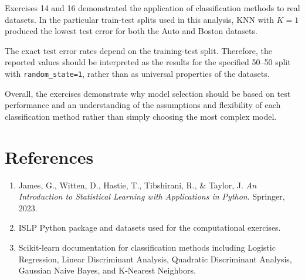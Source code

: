 \documentclass[12pt,a4paper]{article}
\begin{document}
Exercises 14 and 16 demonstrated the application of classification methods
to real datasets. In the particular train-test splits used in this analysis,
KNN with $K=1$ produced the lowest test error for both the Auto and Boston
datasets.

The exact test error rates depend on the training-test split. Therefore, the
reported values should be interpreted as the results for the specified
50--50 split with \texttt{random\_state=1}, rather than as universal
properties of the datasets.

Overall, the exercises demonstrate why model selection should be based on
test performance and an understanding of the assumptions and flexibility of
each classification method rather than simply choosing the most complex
model.


\section{References}

\begin{enumerate}

\item James, G., Witten, D., Hastie, T., Tibshirani, R., \& Taylor, J.
\textit{An Introduction to Statistical Learning with Applications in Python}.
Springer, 2023.

\item ISLP Python package and datasets used for the computational exercises.

\item Scikit-learn documentation for classification methods including
Logistic Regression, Linear Discriminant Analysis, Quadratic Discriminant
Analysis, Gaussian Naive Bayes, and K-Nearest Neighbors.

\end{enumerate}
\end{document}
